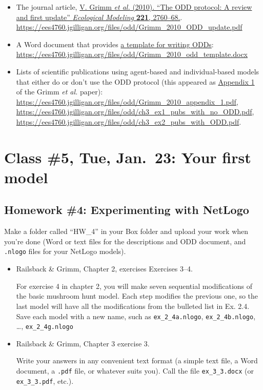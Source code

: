 \documentclass[]{article}
\providecommand{\tightlist}{%
  \setlength{\itemsep}{0pt}\setlength{\parskip}{0pt}}
\begin{document}
\begin{itemize}
\tightlist
\item
  The journal article, \href{/files/odd/Grimm_2010_ODD_update.pdf}{V.
  Grimm \emph{et al.} (2010). ``The ODD protocol: A review and first
  update'' \emph{Ecological Modeling} \textbf{221}, 2760--68.}.
  \url{https://ees4760.jgilligan.org/files/odd/Grimm_2010_ODD_update.pdf}
\item
  A Word document that provides
  \href{/files/odd/Grimm_2010_odd_template.docx}{a template for writing
  ODDs}:
  \url{https://ees4760.jgilligan.org/files/odd/Grimm_2010_odd_template.docx}
\item
  Lists of scientific publications using agent-based and
  individual-based models that either do or don't use the ODD protocol
  (this appeared as \href{/files/odd/Grimm_2010_appendix_1.pdf}{Appendix
  1} of the Grimm \emph{et al.} paper):
  \url{https://ees4760.jgilligan.org/files/odd/Grimm_2010_appendix_1.pdf},
  \url{https://ees4760.jgilligan.org/files/odd/ch3_ex1_pubs_with_no_ODD.pdf},
  \url{https://ees4760.jgilligan.org/files/odd/ch3_ex2_pubs_with_ODD.pdf}.
\end{itemize}

\hypertarget{class-5-tue-jan.23-your-first-model}{%
\section{Class \#5, Tue, Jan.~23: Your first
model}\label{class-5-tue-jan.23-your-first-model}}

\hypertarget{homework-4-experimenting-with-netlogo}{%
\subsection{Homework \#4: Experimenting with
NetLogo}\label{homework-4-experimenting-with-netlogo}}

Make a folder called ``HW\_4'' in your Box folder and upload your work
when you're done (Word or text files for the descriptions and ODD
document, and \texttt{.nlogo} files for your NetLogo models).

\begin{itemize}
\item
  Railsback \& Grimm, Chapter 2, exercises Exercises 3--4.

  For exercise 4 in chapter 2, you will make seven sequential
  modifications of the basic mushroom hunt model. Each step modifies the
  previous one, so the last model will have all the modifications from
  the bulleted list in Ex. 2.4. Save each model with a new name, such as
  \texttt{ex\_2\_4a.nlogo}, \texttt{ex\_2\_4b.nlogo}, \dots,
  \texttt{ex\_2\_4g.nlogo}
\item
  Railsback \& Grimm, Chapter 3 exercise 3.

  Write your answers in any convenient text format (a simple text file,
  a Word document, a \texttt{.pdf} file, or whatever suits you). Call
  the file \texttt{ex\_3\_3.docx} (or \texttt{ex\_3\_3.pdf}, etc.).
\end{itemize}
\end{document}
